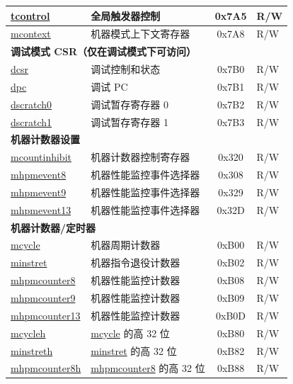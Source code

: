 \begin{longtable}{ | p{4.0cm} | p{8.4cm} | c | l | }
\hyperref[regdesc:TCONTROL]{tcontrol} & 全局触发器控制 & 0x7A5 & R/W \\\hline
\hyperref[regdesc:MCONTEXT]{mcontext} & 机器模式上下文寄存器 & 0x7A8 & R/W \\\hline
\multicolumn{4}{|l|}{\textbf{调试模式 CSR（仅在调试模式下可访问）}} \\\hline
\hyperref[regdesc:DCSR]{dcsr} & 调试控制和状态 & 0x7B0 & R/W \\\hline
\hyperref[regdesc:DPC]{dpc} & 调试 PC & 0x7B1 & R/W \\\hline
\hyperref[regdesc:DSCRATCH0]{dscratch0} & 调试暂存寄存器 0 & 0x7B2 & R/W \\\hline
\hyperref[regdesc:DSCRATCH1]{dscratch1} & 调试暂存寄存器 1 & 0x7B3 & R/W \\\hline
\multicolumn{4}{|l|}{\textbf{机器计数器设置}} \\\hline
\hyperref[regdesc:MCOUNTINHIBIT]{mcountinhibit} & 机器计数器控制寄存器 & 0x320 & R/W \\\hline
\hyperref[regdesc:MHPMEVENT8]{mhpmevent8} & 机器性能监控事件选择器 & 0x308 & R/W \\\hline
\hyperref[regdesc:MHPMEVENT9]{mhpmevent9} & 机器性能监控事件选择器 & 0x329& R/W \\\hline
\hyperref[regdesc:MHPMEVENT13]{mhpmevent13} & 机器性能监控事件选择器 & 0x32D & R/W \\\hline
\multicolumn{4}{|l|}{\textbf{机器计数器/定时器}} \\\hline
\hyperref[regdesc:MCYCLE]{mcycle} & 机器周期计数器 & 0xB00 & R/W \\\hline
\hyperref[regdesc:MINSTRET]{minstret} & 机器指令退役计数器 & 0xB02 & R/W \\\hline
\hyperref[regdesc:MHPMCOUNTER8]{mhpmcounter8} & 机器性能监控计数器 & 0xB08 & R/W \\\hline
\hyperref[regdesc:MHPMCOUNTER9]{mhpmcounter9} & 机器性能监控计数器 & 0xB09 & R/W \\\hline
\hyperref[regdesc:MHPMCOUNTER13]{mhpmcounter13} & 机器性能监控计数器 & 0xB0D & R/W \\\hline
\hyperref[regdesc:MCYCLEH]{mcycleh} & \hyperref[regdesc:MCYCLE]{mcycle} 的高 32 位 & 0xB80 & R/W \\\hline
\hyperref[regdesc:MINSTRETH]{minstreth} & \hyperref[regdesc:MINSTRET]{minstret} 的高 32 位 & 0xB82 & R/W \\\hline
\hyperref[regdesc:MHPMCOUNTER8H]{mhpmcounter8h} & \hyperref[regdesc:MHPMCOUNTER8]{mhpmcounter8} 的高 32 位 & 0xB88 & R/W \\\hline

\end{longtable}
